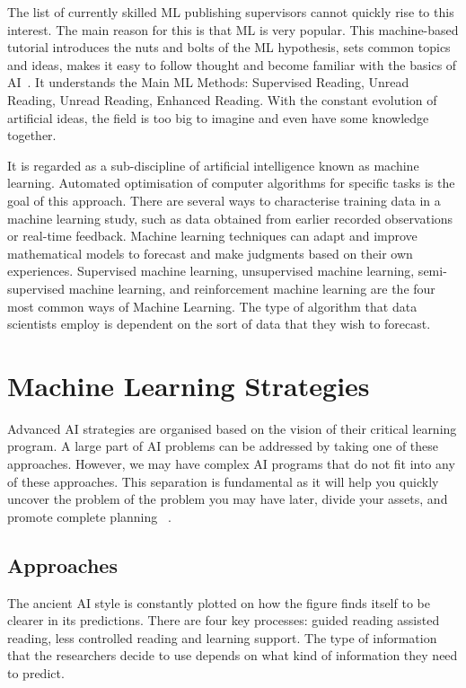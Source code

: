 \documentclass[10pt]{aa}
\begin{document}
The list of currently skilled ML publishing supervisors cannot quickly rise to this interest. The main reason for this is that ML is very popular. This machine-based tutorial introduces the nuts and bolts of the ML hypothesis, sets common topics and ideas, makes it easy to follow thought and become familiar with the basics of AI~\cite{liu_2019_prediction}. It understands the Main ML Methods: Supervised Reading, Unread Reading, Unread Reading, Enhanced Reading. With the constant evolution of artificial ideas, the field is too big to imagine and even have some knowledge together.

It is regarded as a sub-discipline of artificial intelligence known as machine learning. Automated optimisation of computer algorithms for specific tasks is the goal of this approach. There are several ways to characterise training data in a machine learning study, such as data obtained from earlier recorded observations or real-time feedback. Machine learning techniques can adapt and improve mathematical models to forecast and make judgments based on their own experiences. Supervised machine learning, unsupervised machine learning, semi-supervised machine learning, and reinforcement machine learning are the four most common ways of Machine Learning. The type of algorithm that data scientists employ is dependent on the sort of data that they wish to forecast.
\section{Machine Learning Strategies}
Advanced AI strategies are organised based on the vision of their critical learning program. A large part of AI problems can be addressed by taking one of these approaches. However, we may have complex AI programs that do not fit into any of these approaches. This separation is fundamental as it will help you quickly uncover the problem of the problem you may have later, divide your assets, and promote complete planning ~\cite{parbat_2020_a}.
\subsection{Approaches} 
The ancient AI style is constantly plotted on how the figure finds itself to be clearer in its predictions. There are four key processes: guided reading assisted reading, less controlled reading and learning support. The type of information that the researchers decide to use depends on what kind of information they need to predict.
\end{document}
